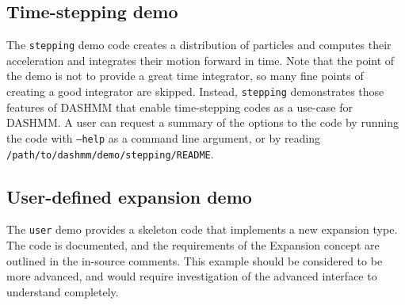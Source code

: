 \subsection{Time-stepping demo}
The {\tt stepping} demo code creates a distribution of particles and
computes their acceleration and integrates their motion forward in
time. Note that the point of the demo is not to provide a great time
integrator, so many fine points of creating a good integrator are
skipped. Instead, {\tt stepping} demonstrates those features of DASHMM
that enable time-stepping codes as a use-case for DASHMM. A user can
request a summary of the options to the code by running the code with
{\tt --help} as a command line argument, or by reading {\tt
  /path/to/dashmm/demo/stepping/README}.

\subsection{User-defined expansion demo}

The {\tt user} demo provides a skeleton code that implements a new
expansion type. The code is documented, and the requirements of the
Expansion concept are outlined in the in-source comments. This example
should be considered to be more advanced, and would require
investigation of the advanced interface to understand completely.
